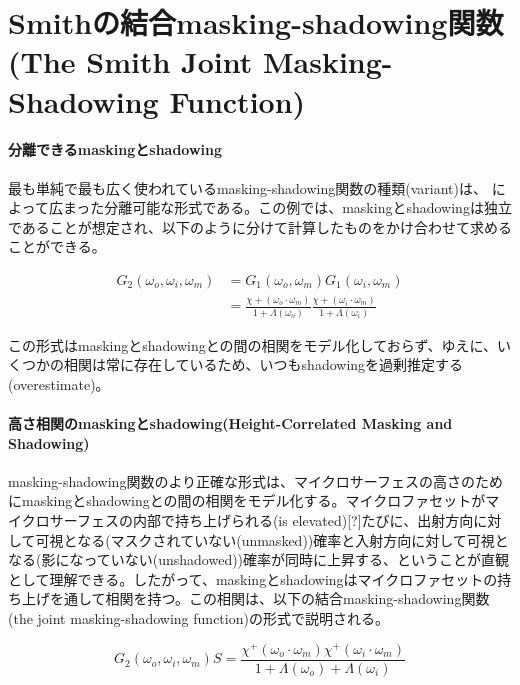 \documentclass[a4j,xelatex,ja=standard]{bxjsarticle}
\begin{document}
\section{Smithの結合masking-shadowing関数(The Smith Joint Masking-Shadowing Function)}
\label{sec:6}

\paragraph{分離できるmaskingとshadowing}

最も単純で最も広く使われているmasking-shadowing関数の種類(variant)は、\citeauthor{Walter2007} \cite{Walter2007}によって広まった分離可能な形式である。この例では、maskingとshadowingは独立であることが想定され、以下のように分けて計算したものをかけ合わせて求めることができる。

\begin{equation}
    \begin{split}
        G_2(\omega_o, \omega_i, \omega_m) & = G_1(\omega_o, \omega_m) G_1(\omega_i, \omega_m) \\
                                          & = \frac{\chi+(\omega_o \cdot \omega_m)}{1 + \Lambda(\omega_o)} \frac{\chi+(\omega_i \cdot \omega_m)}{1 + \Lambda(\omega_i)}
    \end{split}
    \label{eq:98}
\end{equation}

この形式はmaskingとshadowingとの間の相関をモデル化しておらず、ゆえに、いくつかの相関は常に存在しているため、いつもshadowingを過剰推定する(overestimate)。

\paragraph{高さ相関のmaskingとshadowing(Height-Correlated Masking and Shadowing)}

masking-shadowing関数のより正確な形式は、マイクロサーフェスの高さのためにmaskingとshadowingとの間の相関をモデル化する\cite{Ross2005}。マイクロファセットがマイクロサーフェスの内部で持ち上げられる(is elevated)[?]たびに、出射方向に対して可視となる(マスクされていない(unmasked))確率と入射方向に対して可視となる(影になっていない(unshadowed))確率が同時に上昇する、ということが直観として理解できる。したがって、maskingとshadowingはマイクロファセットの持ち上げを通して相関を持つ。この相関は、以下の結合masking-shadowing関数(the joint masking-shadowing function)の形式で説明される。

\begin{equation}
    G_2(\omega_o, \omega_i, \omega_m) S= \frac{\chi^+(\omega_o \cdot \omega_m) \chi^+(\omega_i \cdot \omega_m)}{1 + \Lambda(\omega_o) + \Lambda(\omega_i)}
    \label{eq:99}
\end{equation}
\end{document}

